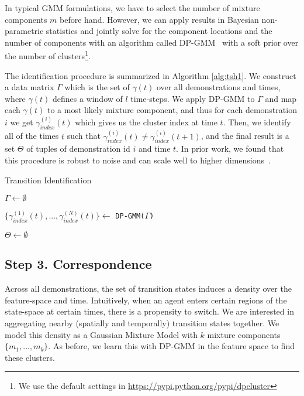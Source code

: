 In typical GMM formulations, we have to select the number of mixture components $m$ before hand.
However, we can apply results in Bayesian non-parametric statistics and jointly solve for the component locations and the number of components with an algorithm called DP-GMM~\cite{kulis2011revisiting} with a soft prior over the number of clusters\footnote{We use the default settings in \url{https://pypi.python.org/pypi/dpcluster}}.

The identification procedure is summarized in Algorithm \ref{alg:tsh1}.
We construct a data matrix $\Gamma$ which is the set of $\gamma(t)$ over all demonstrations and times, where $\gamma(t)$ defines a window of $l$ time-steps.
We apply DP-GMM to $\Gamma$ and map each $\gamma(t)$ to a most likely mixture component, and thus for each demonstration $i$ we get $\gamma_{index}^{(i)}(t)$ which gives us the cluster index at time $t$.
Then, we identify all of the times $t$ such that $\gamma_{index}^{(i)}(t) \ne \gamma_{index}^{(i)}(t+1)$, and the final result is a set $\Theta$ of tuples of demonstration id $i$ and time $t$.
In prior work, we found that this procedure is robust to noise and can scale well to higher dimensions~\cite{krishnan2015tsc,murali2016}.

\begin{algorithm}[t]
\small
\DontPrintSemicolon
\caption{Transition Identification \label{alg:tsh1}}

$\Gamma \leftarrow \emptyset$

$\{\gamma_{index}^{(1)}(t),...,\gamma_{index}^{(N)}(t)\} \leftarrow$ \texttt{DP-GMM($\Gamma$)}
\vspace{0.5em}

$\Theta \leftarrow \emptyset$


\end{algorithm}

\subsection*{Step 3. Correspondence}
Across all demonstrations, the set of transition states induces a density over the feature-space and time.
Intuitively, when an agent enters certain regions of the state-space at certain times, there is a propensity to switch.
We are interested in aggregating nearby (spatially and temporally) transition states together.
We model this density as a Gaussian Mixture Model with $k$ mixture components $\{m_1,...,m_k\}$.
As before, we learn this with DP-GMM in the feature space to find these clusters.

